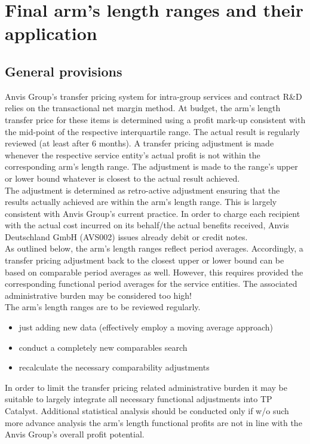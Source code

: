 \documentclass[12pt]{article}
\begin{document}
\pagestyle{fancy}

\rfoot{\footnotesize \thepage}
\section{Final arm's length ranges and their application}
\subsection{General provisions}
Anvis Group's transfer pricing system for intra-group services and contract R\&D relies on the transactional net margin method. At budget, the arm's length transfer price for these items is determined using a profit mark-up consistent with the mid-point of the respective interquartile range. The actual result is regularly reviewed (at least after 6 months). A transfer pricing adjustment is made whenever the respective service entity's actual profit is not within the corresponding arm's length range. The adjustment is made to the range's upper or lower bound whatever is closest to the actual result achieved.\\[0.2cm]
The adjustment is determined as retro-active adjustment ensuring that the results actually achieved are within the arm's length range. This is largely consistent with Anvis Group's current practice. In order to charge each recipient with the actual cost incurred on its behalf/the actual benefits received, Anvis Deutschland GmbH (AVS002) issues already debit or credit notes.\\[0.2cm]
As outlined below, the arm's length ranges reflect period averages. Accordingly, a transfer pricing adjustment back to the closest upper or lower bound can be based on comparable period averages as well. However, this requires provided the corresponding functional period averages for the service entities. The associated administrative burden may be considered too high!\\[0.2cm]
The arm's length ranges are to be reviewed regularly.\begin{itemize}
  \item just adding new data (effectively employ a moving average approach)
  \item conduct a completely new comparables search
  \item recalculate the necessary comparability adjustments
\end{itemize}
In order to limit the transfer pricing related administrative burden it may be suitable to largely integrate all necessary functional adjustments into TP Catalyst. Additional statistical analysis should be conducted only if w/o such more advance analysis the arm's length functional profits are not in line with the Anvis Group's overall profit potential.
\end{document}
